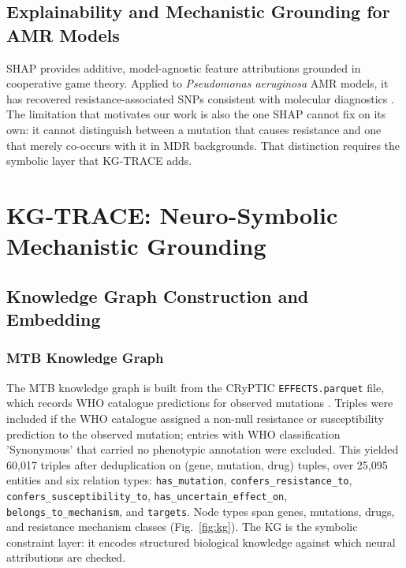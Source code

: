 \documentclass[conference]{IEEEtran}
\begin{document}
\subsection{Explainability and Mechanistic Grounding for AMR Models}

SHAP \cite{shap} provides additive, model-agnostic feature attributions grounded in cooperative game theory. Applied to \textit{Pseudomonas aeruginosa} AMR models, it has recovered resistance-associated SNPs consistent with molecular diagnostics \cite{shap_amr}. The limitation that motivates our work is also the one SHAP cannot fix on its own: it cannot distinguish between a mutation that causes resistance and one that merely co-occurs with it in MDR backgrounds. That distinction requires the symbolic layer that KG-TRACE adds.

\section{KG-TRACE: Neuro-Symbolic Mechanistic Grounding}\label{sec:methods}

\subsection{Knowledge Graph Construction and Embedding}

\subsubsection{MTB Knowledge Graph}

The MTB knowledge graph is built from the CRyPTIC \texttt{EFFECTS.parquet} file, which records WHO catalogue predictions for observed mutations \cite{who_cat_v1,who_cat_v2}. Triples were included if the WHO catalogue assigned a non-null resistance or susceptibility prediction to the observed mutation; entries with WHO classification 'Synonymous' that carried no phenotypic annotation were excluded. This yielded 60,017 triples after deduplication on (gene, mutation, drug) tuples, over 25,095 entities and six relation types: \texttt{has\_mutation}, \texttt{confers\_resistance\_to}, \texttt{confers\_susceptibility\_to}, \texttt{has\_uncertain\_effect\_on}, \texttt{belongs\_to\_mechanism}, and \texttt{targets}. Node types span genes, mutations, drugs, and resistance mechanism classes (Fig.~\ref{fig:kg}). The KG is the symbolic constraint layer: it encodes structured biological knowledge against which neural attributions are checked.
\end{document}
